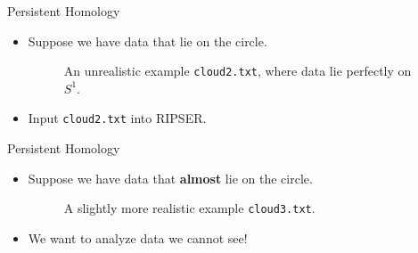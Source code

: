 \documentclass[usenames,dvipsnames,aspectratio=1610]{beamer}
\begin{document}
\begin{frame}{Persistent Homology}
\begin{itemize}
\item<1-> Suppose we have data that lie on the circle.
\begin{center}
\begin{figure}
\caption{An unrealistic example \texttt{cloud2.txt}, where data lie perfectly on $S^1$.}
\end{figure}
\end{center}
\item<2-> Input \texttt{cloud2.txt} into RIPSER.
\end{itemize}
\end{frame}
\begin{frame}{Persistent Homology}
\begin{itemize}
\item<1-> Suppose we have data that \textbf{almost} lie on the circle.
\begin{center}
\begin{figure}
\caption{A slightly more realistic example \texttt{cloud3.txt}.}
\end{figure}
\end{center}
\item<2-> We want to analyze data we cannot see!
\end{itemize}
\end{frame}
\end{document}
